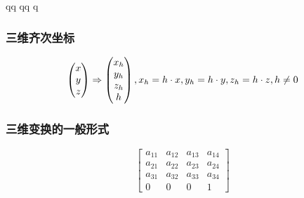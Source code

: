 qq	qq	q                                                                                                                                                                                                                                                                                      \documentclass{article}
\begin{document}
\begin{CJK}{UTF8}{gbsn}
	\subsubsection{三维齐次坐标}
	$$
	\begin{pmatrix}
	x\\y\\z
	\end{pmatrix}
	\Rightarrow\begin{pmatrix}
	x_h\\y_h\\z_h\\h
	\end{pmatrix},x_h=h\cdot x,y_h=h\cdot y,z_h=h\cdot z,h\neq 0\\
	$$
	\subsubsection{三维变换的一般形式}
	$$
	\begin{bmatrix}
	a_{11}&a_{12}&a_{13}&a_{14}\\
	a_{21}&a_{22}&a_{23}&a_{24}\\
	a_{31}&a_{32}&a_{33}&a_{34}\\
	0&0&0&1
	\end{bmatrix}
	$$

\end{CJK}
\end{document}
